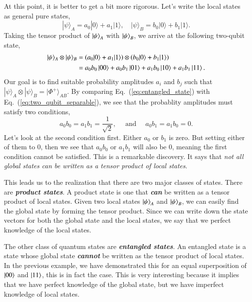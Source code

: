 At this point, it is better to get a bit more rigorous.
Let's write the local states as general pure states,
\begin{equation}
    |\psi\rangle_A = a_0|0\rangle + a_1|1\rangle, \quad |\psi\rangle_B = b_0|0\rangle + b_1|1\rangle.
\end{equation}
Taking the tensor product of $\left| \psi \right\rangle_A$ with $\left| \psi \right\rangle_B$, we arrive at the following two-qubit state, 
\begin{align}
    |\psi\rangle_{A} \otimes|\psi\rangle_{B} & = \left(a_{0}|0\rangle+a_{1}|1\rangle\right) \otimes\left(b_{0}|0\rangle+b_{1}|1\rangle\right) \nonumber\\
    & = a_0 b_0\ket{00} + a_0 b_1\ket{01} + a_1 b_0\ket{10} + a_1 b_1\ket{11}.
    \label{eq:two_qubit_separable}
\end{align}
Our goal is to find suitable probability amplitudes $a_i$ and $b_j$ such that $|\psi\rangle_{A} \otimes|\psi\rangle_{B} = |\Phi^+\rangle_{AB}$.
By comparing Eq.~(\ref{eq:entangled_state}) with Eq.~(\ref{eq:two_qubit_separable}), we see that the probablity amplitudes must satisfy two conditions,
\begin{equation}
    a_0 b_0 = a_1 b_1 = \frac{1}{\sqrt{2}}, \quad \text{ and }\quad a_0 b_1 = a_1 b_0 = 0.
\end{equation}
Let's look at the second condition first.
Either $a_0$ or $b_1$ is zero.
But setting either of them to 0, then we see that $a_0 b_0$ or $a_1 b_1$ will also be 0, meaning the first condition cannot be satisfied.
This is a remarkable discovery.
It says that \emph{not all global states can be written as a tensor product of local states}.

This leads us to the realization that there are two major classes of states.
There are \textbf{\emph{product states}}.
A product state is one that \textbf{\emph{can}} be written as a tensor product of local states.
Given two local states $\left| \psi \right\rangle_A$ and $\left| \psi \right\rangle_B$, we can easily find the global state by forming the tensor product.
Since we can write down the state vectors for both the global state and the local states, we say that we perfect knowledge of the local states.

The other class of quantum states are \textbf{\emph{entangled states}}.
An entangled state is a state whose global state \textbf{\emph{cannot}} be written as the tensor product of local states.
In the previous example, we have demonstrated this for an equal superposition of $\left| 00 \right\rangle$ and $\left| 11 \right\rangle$, this is in fact the case.
This is very interesting because it implies that we have perfect knowledge of the global state, but we have imperfect knowledge of local states.



